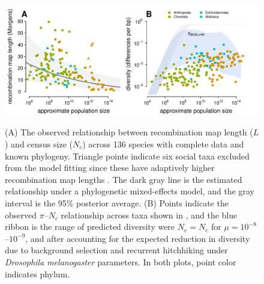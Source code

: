 \documentclass[9pt,lineno]{elife}
\begin{document}
\begin{figure}[t!]
  \begin{fullwidth}
  \includegraphics[width=\linewidth]{figures/figure_3.pdf}

  \caption{(A) The observed relationship between recombination map length ($L$)
    and census size ($N_c$) across 136 species with complete data and known
    phylogeny. Triangle points indicate six social taxa excluded from the model
    fitting since these have adaptively higher recombination map lengths
    \citep{Wilfert2007-dx}. The dark gray line is the estimated
    relationship under a phylogenetic mixed-effects model, and the gray
    interval is the 95\% posterior average. (B) Points indicate the observed
    $\pi$--$N_c$ relationship across taxa shown in ,
    and the blue ribbon is the range of predicted diversity were $N_e = N_c$
    for $\mu = 10^{-8}$--$10^{-9}$,  and after accounting for the expected
  reduction in diversity due to background selection and recurrent hitchhiking
under \emph{Drosophila melanogaster} parameters. In both plots, point color
indicates phylum.}\label{fig:linksel}

  \label{figsupp:genome-size-Nc}


\end{fullwidth}
\end{figure}
\end{document}
